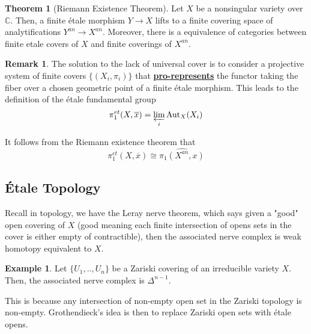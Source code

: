 \documentclass{article}
\theoremstyle{definition}
\newtheorem{theorem}{Theorem}[section]
\theoremstyle{definition}
\theoremstyle{definition}
\newtheorem{remark}{Remark}[theorem]
\theoremstyle{definition}
\theoremstyle{definition}
\theoremstyle{definition}
\theoremstyle{definition}
\newtheorem{example}{Example}[theorem]
\begin{document}
\begin{tcolorbox}[colback=red!5!white,colframe=red!30!white]
\begin{theorem}[Riemann Existence Theorem]
Let $X$ be a nonsingular variety over $\mathbb{C}$. Then, a finite \'etale morphism $Y\to X$ lifts to a finite covering space of analytifications $Y^{an}\to X^{an}$. Moreover, there is a equivalence of categories between finite etale covers of $X$ and finite coverings of $X^{an}$.
\end{theorem}
\end{tcolorbox}


\begin{tcolorbox}[colback=green!5!white,colframe=green!30!white]
\begin{remark}
The solution to the lack of universal cover is to consider a projective system of finite covers $\{(X_i,\pi_i)\}$ that \underline{\textbf{pro-represents}} the functor taking the fiber over a chosen geometric point of a finite \'etale morphism. This leads to the definition of the \'etale fundamental group
\[\pi_1^{et}(X,\overline{x})=\varprojlim_i \textrm{Aut}_X(X_i)\]

It follows from the Riemann existence theorem that 
\[\pi_1^{et}(X,\overline{x})\cong \widehat{\pi_1(X^{an},x)}\]
\end{remark}
\end{tcolorbox}

\subsection{\'Etale Topology}
Recall in topology, we have the Leray nerve theorem, which says given a "good" open covering of $X$ (good meaning each finite intersection of opens sets in the cover is either empty of contractible), then the associated nerve complex is weak homotopy equivalent to $X$.


\begin{tcolorbox}[colback=yellow!5!white,colframe=yellow!30!white]
\begin{example}
Let $\{U_1,..,U_n\}$ be a Zariski covering of an irreducible variety $X$. Then, the associated nerve complex is $\Delta^{n-1}$.
\end{example}
\end{tcolorbox}
This is because any intersection of non-empty open set in the Zariski topology is non-empty. Grothendieck's idea is then to replace Zariski open sets with \'etale opens.
\end{document}
